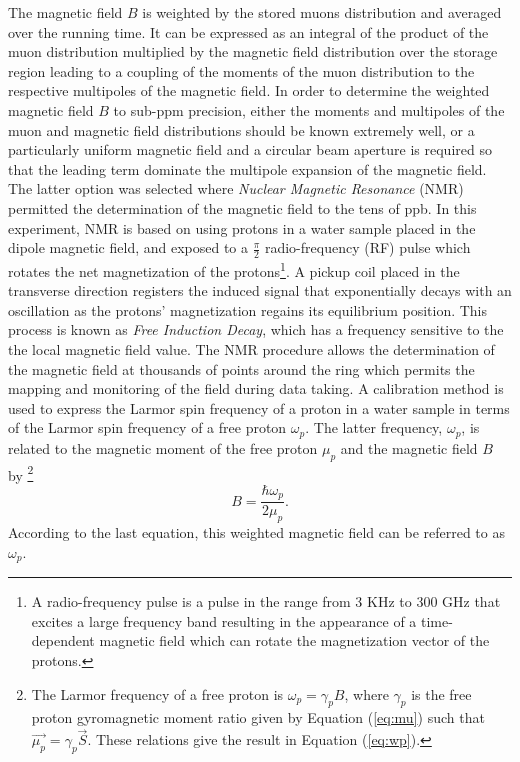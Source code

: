 \documentclass{outhesis}
\begin{document}
The magnetic field $B$ is weighted by the stored muons distribution and averaged over the running time. It can be expressed as an integral of the product of the muon distribution multiplied by the magnetic field distribution over the storage region leading to a coupling of the moments of the muon distribution to the respective multipoles of the magnetic field. In order to determine the weighted magnetic field $B$ to sub-ppm precision, either the moments and multipoles of the muon and magnetic field distributions should be known extremely well, or a particularly uniform magnetic field and a circular beam aperture is required so that the leading term dominate the multipole expansion of the magnetic field. The latter option was selected where \emph{Nuclear Magnetic Resonance} (NMR) permitted the determination of the magnetic field to the tens of ppb. In this experiment, NMR is based on using protons in a water sample placed in the dipole magnetic field, and exposed to a $\frac{\pi}{2}$ radio-frequency (RF) pulse which rotates the net magnetization of the protons\footnote{A radio-frequency pulse is a pulse in the range from 3 KHz to 300 GHz that excites a large frequency band resulting in the appearance of a time-dependent magnetic field which can rotate the magnetization vector of the protons.}. A pickup coil placed in the transverse direction registers the induced signal that exponentially decays with an oscillation as the protons' magnetization regains its equilibrium position. This process is known as \emph{Free Induction Decay}, which has a frequency sensitive to the the local magnetic field value. The NMR procedure allows the determination of the magnetic field at thousands of points around the ring which permits the mapping and monitoring of the field during data taking. A calibration method is used to express the Larmor spin frequency of a proton in a water sample in terms of the Larmor spin frequency of a free proton $\omega_p$. The latter frequency, $\omega_p$, is related to the magnetic moment of the free proton $\mu_p$ and the magnetic field $B$ by \footnote{The Larmor frequency of a free proton is $\omega_p=\gamma_pB$, where $\gamma_p$ is the free proton gyromagnetic moment ratio given by Equation (\ref{eq:mu}) such that $\overrightarrow{\mu_p} = \gamma_p \overrightarrow{S}$. These relations give the result in Equation (\ref{eq:wp}).}
\begin{equation}
B = \frac{\hbar\omega_p}{2\mu_p}.
\label{eq:wp}
\end{equation} 
According to the last equation, this weighted magnetic field can be referred to as $\omega_p$. 
\end{document}
